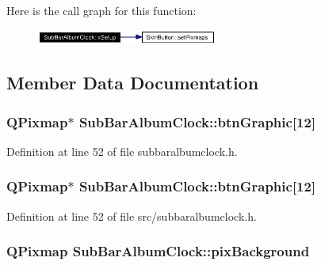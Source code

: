Here is the call graph for this function:\begin{figure}[H]
\begin{center}
\leavevmode
\includegraphics[width=168pt]{classSubBarAlbumClock_SubBarAlbumClocka2_cgraph}
\end{center}
\end{figure}


\subsection{Member Data Documentation}
\subsubsection{\setlength{\rightskip}{0pt plus 5cm}QPixmap$\ast$ {\bf Sub\-Bar\-Album\-Clock::btn\-Graphic}[12]\hspace{0.3cm}{\tt  [private]}}\label{classSubBarAlbumClock_SubBarAlbumClockr3}




Definition at line 52 of file subbaralbumclock.h.
\subsubsection{\setlength{\rightskip}{0pt plus 5cm}QPixmap$\ast$ {\bf Sub\-Bar\-Album\-Clock::btn\-Graphic}[12]\hspace{0.3cm}{\tt  [private]}}\label{classSubBarAlbumClock_SubBarAlbumClockr0}




Definition at line 52 of file src/subbaralbumclock.h.
\subsubsection{\setlength{\rightskip}{0pt plus 5cm}QPixmap {\bf Sub\-Bar\-Album\-Clock::pix\-Background}\hspace{0.3cm}{\tt  [private]}}\label{classSubBarAlbumClock_SubBarAlbumClockr1}




